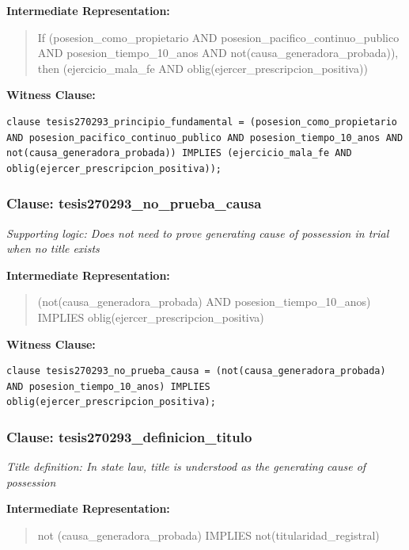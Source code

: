 \documentclass[11pt,a4paper]{article}
\begin{document}
\textbf{Intermediate Representation:}

\begin{quote}
If (posesion\_como\_propietario AND posesion\_pacifico\_continuo\_publico AND posesion\_tiempo\_10\_anos AND not(causa\_generadora\_probada)), then (ejercicio\_mala\_fe AND oblig(ejercer\_prescripcion\_positiva))
\end{quote}

\textbf{Witness Clause:}

\begin{lstlisting}[style=witnessstyle, language=Witness]
clause tesis270293_principio_fundamental = (posesion_como_propietario AND posesion_pacifico_continuo_publico AND posesion_tiempo_10_anos AND not(causa_generadora_probada)) IMPLIES (ejercicio_mala_fe AND oblig(ejercer_prescripcion_positiva));
\end{lstlisting}

\subsubsection{Clause: tesis270293\_no\_prueba\_causa}

\textit{Supporting logic: Does not need to prove generating cause of possession in trial when no title exists}

\textbf{Intermediate Representation:}

\begin{quote}
(not(causa\_generadora\_probada) AND posesion\_tiempo\_10\_anos) IMPLIES oblig(ejercer\_prescripcion\_positiva)
\end{quote}

\textbf{Witness Clause:}

\begin{lstlisting}[style=witnessstyle, language=Witness]
clause tesis270293_no_prueba_causa = (not(causa_generadora_probada) AND posesion_tiempo_10_anos) IMPLIES oblig(ejercer_prescripcion_positiva);
\end{lstlisting}

\subsubsection{Clause: tesis270293\_definicion\_titulo}

\textit{Title definition: In state law, title is understood as the generating cause of possession}

\textbf{Intermediate Representation:}

\begin{quote}
not (causa\_generadora\_probada) IMPLIES not(titularidad\_registral)
\end{quote}
\end{document}
